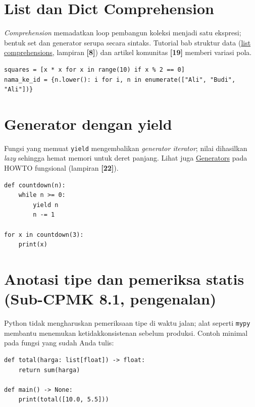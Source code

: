 \documentclass[../main.tex]{subfiles}
\begin{document}
\section{List dan Dict Comprehension}

\noindent \textit{Comprehension} memadatkan loop pembangun koleksi menjadi satu ekspresi; bentuk set dan generator serupa secara sintaks. Tutorial bab struktur data (\href{https://docs.python.org/3/tutorial/datastructures.html#list-comprehensions}{list comprehensions}, lampiran \textbf{[8]}) dan artikel komunitas \textbf{[19]} memberi variasi pola.

\begin{lstlisting}[caption=Comprehension]
squares = [x * x for x in range(10) if x % 2 == 0]
nama_ke_id = {n.lower(): i for i, n in enumerate(["Ali", "Budi", "Ali"])}
\end{lstlisting}

\section{Generator dengan yield}

\noindent Fungsi yang memuat \texttt{yield} mengembalikan \textit{generator iterator}; nilai dihasilkan \textit{lazy} sehingga hemat memori untuk deret panjang. Lihat juga \href{https://docs.python.org/3/howto/functional.html#generators}{Generators} pada HOWTO fungsional (lampiran \textbf{[22]}).

\begin{lstlisting}[caption=Generator sederhana]
def countdown(n):
    while n >= 0:
        yield n
        n -= 1

for x in countdown(3):
    print(x)
\end{lstlisting}

\section{Anotasi tipe dan pemeriksa statis (Sub-CPMK 8.1, pengenalan)}

Python tidak mengharuskan pemeriksaan tipe di waktu jalan; alat seperti \texttt{mypy} membantu menemukan ketidakkonsistenan sebelum produksi. Contoh minimal pada fungsi yang sudah Anda tulis:

\begin{lstlisting}[caption=Anotasi tipe dasar]
def total(harga: list[float]) -> float:
    return sum(harga)

def main() -> None:
    print(total([10.0, 5.5]))
\end{lstlisting}
\end{document}
